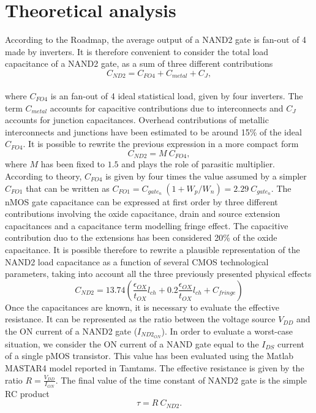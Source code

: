 \section{Theoretical analysis}
According to the Roadmap, the average output of a NAND2 gate is fan-out of 4 made by inverters. It is therefore convenient to consider the total load capacitance of a NAND2 gate, as a sum of three different contributions
\begin{equation}
C_{ND2} = C_{FO4} + C_{metal} + C_J,
\end{equation}\\
where $C_{FO4}$ is an fan-out of 4 ideal statistical load, given by four inverters. The term $ C_{metal}$ accounts for capacitive contributions due to interconnects and $C_J$ accounts for junction capacitances. Overhead contributions of metallic interconnects and junctions have been estimated to be around 15\% of the ideal $C_{FO4}$.
It is possible to rewrite the previous expression in a more compact form
\begin{equation}
C_{ND2} = M \ C_{FO4},
\end{equation}
where $M$ has been fixed to  $1.5$ and plays the role of parasitic multiplier. According to theory,  $C_{FO4}$ is given by four times the value assumed by a simpler $C_{FO1}$ that can be written as $C_{FO1} = C_{gate_n}\ (1 + W_p/W_n) = 2.29 \  C_{gate_n}$. The nMOS gate capacitance can be expressed at first order by three different contributions involving the oxide capacitance, drain and source extension capacitances and a capacitance term modelling fringe effect. The capacitive contribution duo to the extensions has been considered 20\% of the oxide capacitance.  It is possible therefore to rewrite a plausible representation of the NAND2 load capacitance as a function of several CMOS technological parameters, taking into account all the three previously presented physical effects
\begin{equation}
C_{ND2} = 13.74 \left( \frac{\epsilon_{OX}}{t_{OX}} l_{ch} + 0.2 \frac{\epsilon_{OX}}{t_{OX}}  l_{ch} + C_{fringe}  \right) 
\end{equation}
Once the capacitances are known, it is necessary to evaluate the effective resistance. It can be represented as the ratio between the voltage source $V_{DD}$ and the ON current of a NAND2 gate ($I_{ND2_{ON}}$). In order to evaluate a worst-case situation, we consider the ON current of a NAND gate equal to the $I_{DS}$ current of a single pMOS transistor. This value has been evaluated using the Matlab MASTAR4 model reported in Tamtams. The effective resistance is given by the ratio $R = \frac{V_{DD}}{I_{ON}}$. The final value of the time constant of NAND2 gate is the simple RC product
\begin{equation}
\tau = R \ C_{ND2}.
\end{equation}

